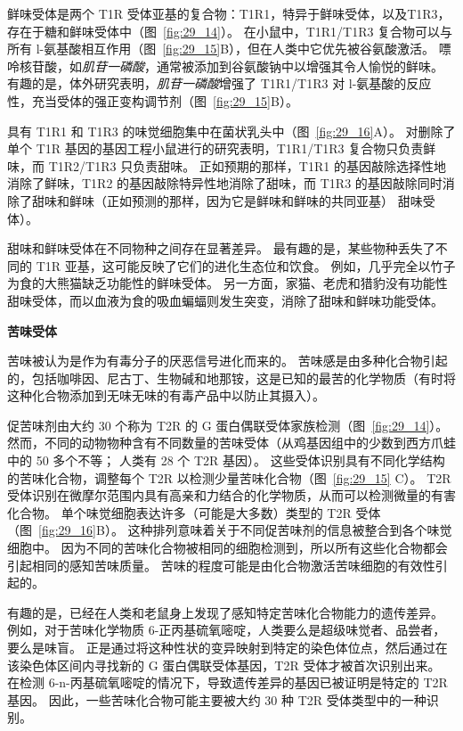 鲜味受体是两个 T1R 受体亚基的复合物：T1R1，特异于鲜味受体，以及T1R3，存在于糖和鲜味受体中（图~\ref{fig:29_14}）。
在小鼠中，T1R1/T1R3 复合物可以与所有 l-氨基酸相互作用（图~\ref{fig:29_15}B），但在人类中它优先被谷氨酸激活。
嘌呤核苷酸，如\textit{肌苷一磷酸}，通常被添加到谷氨酸钠中以增强其令人愉悦的鲜味。
有趣的是，体外研究表明，\textit{肌苷一磷酸}增强了 T1R1/T1R3 对 l-氨基酸的反应性，充当受体的强正变构调节剂（图~\ref{fig:29_15}B）。


具有 T1R1 和 T1R3 的味觉细胞集中在菌状乳头中（图~\ref{fig:29_16}A）。
对删除了单个 T1R 基因的基因工程小鼠进行的研究表明，T1R1/T1R3 复合物只负责鲜味，而 T1R2/T1R3 只负责甜味。
正如预期的那样，T1R1 的基因敲除选择性地消除了鲜味，T1R2 的基因敲除特异性地消除了甜味，而 T1R3 的基因敲除同时消除了甜味和鲜味（正如预测的那样，因为它是鲜味和鲜味的共同亚基） 甜味受体）。


甜味和鲜味受体在不同物种之间存在显著差异。
最有趣的是，某些物种丢失了不同的 T1R 亚基，这可能反映了它们的进化生态位和饮食。
例如，几乎完全以竹子为食的大熊猫缺乏功能性的鲜味受体。
另一方面，家猫、老虎和猎豹没有功能性甜味受体，而以血液为食的吸血蝙蝠则发生突变，消除了甜味和鲜味功能受体。



\textbf{苦味受体}

苦味被认为是作为有毒分子的厌恶信号进化而来的。
苦味感是由多种化合物引起的，包括咖啡因、尼古丁、生物碱和地那铵，这是已知的最苦的化学物质（有时将这种化合物添加到无味无味的有毒产品中以防止其摄入）。


促苦味剂由大约 30 个称为 T2R 的 G 蛋白偶联受体家族检测（图~\ref{fig:29_14}）。
然而，不同的动物物种含有不同数量的苦味受体（从鸡基因组中的少数到西方爪蛙中的 50 多个不等；
人类有 28 个 T2R 基因）。
这些受体识别具有不同化学结构的苦味化合物，调整每个 T2R 以检测少量苦味化合物（图~\ref{fig:29_15} C）。
T2R 受体识别在微摩尔范围内具有高亲和力结合的化学物质，从而可以检测微量的有害化合物。
单个味觉细胞表达许多（可能是大多数）类型的 T2R 受体（图~\ref{fig:29_16}B）。
这种排列意味着关于不同促苦味剂的信息被整合到各个味觉细胞中。
因为不同的苦味化合物被相同的细胞检测到，所以所有这些化合物都会引起相同的感知苦味质量。
苦味的程度可能是由化合物激活苦味细胞的有效性引起的。


有趣的是，已经在人类和老鼠身上发现了感知特定苦味化合物能力的遗传差异。
例如，对于苦味化学物质 6-正丙基硫氧嘧啶，人类要么是超级味觉者、品尝者，要么是味盲。
正是通过将这种性状的变异映射到特定的染色体位点，然后通过在该染色体区间内寻找新的 G 蛋白偶联受体基因，T2R 受体才被首次识别出来。
在检测 6-n-丙基硫氧嘧啶的情况下，导致遗传差异的基因已被证明是特定的 T2R 基因。
因此，一些苦味化合物可能主要被大约 30 种 T2R 受体类型中的一种识别。


